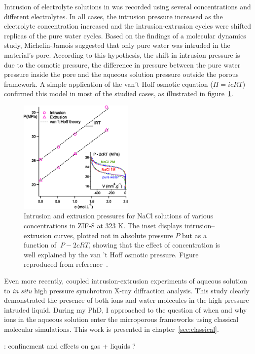\documentclass[thesis]{subfiles}
\begin{document}
Intrusion of electrolyte solutions in  was recorded using several
concentrations and different electrolytes\cite{Ortiz2014, MichelinJamois2015}.
In all cases, the intrusion pressure increased as the electrolyte concentration
increased and the intrusion-extrusion cycles were shifted replicas of the pure
water cycles. Based on the findings of a molecular dynamics study\cite{Hu2011},
Michelin-Jamois suggested that only pure water was intruded in the material's
pore. According to this hypothesis, the shift in intrusion pressure is due to
the osmotic pressure, \ie the difference in pressure between the pure water
pressure inside the pore and the aqueous solution pressure outside the porous
framework. A simple application of the van't Hoff osmotic equation ($\Pi = i c R
T$) confirmed this model in most of the studied cases, as illustrated in
figure~\ref{fig:osmotic-zif}.

\begin{figure}[ht]
    \centering
    \includegraphics[width=0.5\textwidth]{figures/cited/osmotic-zif}
    \caption{Intrusion and extrusion pressures for NaCl solutions of
    various concentrations in ZIF-8 at 323 K. The inset displays
    intrusion--extrusion curves, plotted not in absolute pressure $P$ but as a
    function of $\ P - 2cRT$, showing that the effect of concentration is well
    explained by the van 't Hoff osmotic pressure. Figure reproduced from
    reference~\cite{MichelinJamois2015}.}
    \label{fig:osmotic-zif}
\end{figure}

Even more recently, \citeauthor{Arletti2016}\cite{Arletti2016} coupled
intrusion-extrusion experiments of  aqueous solution to \emph{in situ}
high pressure synchrotron X-ray diffraction analysis. This study clearly
demonstrated the presence of both ions and water molecules in the high pressure
intruded liquid. During my PhD, I approached to the question of when and why
ions in the aqueous solution enter the microporous frameworks using classical
molecular simulations. This work is presented in chapter~\ref{sec:classical}.

\TODO: confinement and effects on gas + liquids ?

\OnlyInSubfile{\printglobalbibliography}
\end{document}
